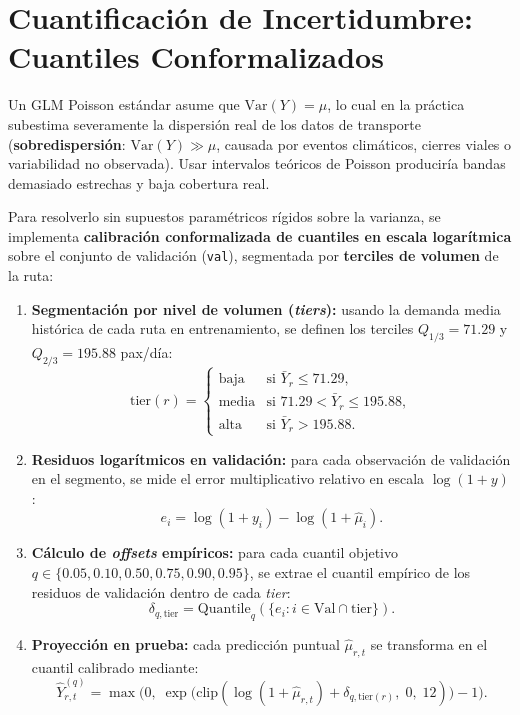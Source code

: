 \documentclass[11pt,a4paper]{article}
\begin{document}
\section{Cuantificación de Incertidumbre: Cuantiles Conformalizados}

Un GLM Poisson estándar asume que $\text{Var}(Y) = \mu$, lo cual en la práctica subestima severamente la dispersión real de los datos de transporte (\textbf{sobredispersión}: $\text{Var}(Y) \gg \mu$, causada por eventos climáticos, cierres viales o variabilidad no observada). Usar intervalos teóricos de Poisson produciría bandas demasiado estrechas y baja cobertura real.

Para resolverlo sin supuestos paramétricos rígidos sobre la varianza, se implementa \textbf{calibración conformalizada de cuantiles en escala logarítmica} sobre el conjunto de validación (\texttt{val}), segmentada por \textbf{terciles de volumen} de la ruta:

\begin{enumerate}[leftmargin=1.5em]
    \item \textbf{Segmentación por nivel de volumen (\textit{tiers}):} usando la demanda media histórica de cada ruta en entrenamiento, se definen los terciles $Q_{1/3} = 71.29$ y $Q_{2/3} = 195.88$ pax/día:
    \[
    \text{tier}(r) =
    \begin{cases}
    \text{baja}  & \text{si } \bar{Y}_r \le 71.29, \\
    \text{media} & \text{si } 71.29 < \bar{Y}_r \le 195.88, \\
    \text{alta}  & \text{si } \bar{Y}_r > 195.88.
    \end{cases}
    \]
    \item \textbf{Residuos logarítmicos en validación:} para cada observación de validación en el segmento, se mide el error multiplicativo relativo en escala $\log(1+y)$:
    \[
    e_i = \log(1 + y_i) - \log(1 + \hat{\mu}_i).
    \]
    \item \textbf{Cálculo de \textit{offsets} empíricos:} para cada cuantil objetivo $q \in \{0.05, 0.10, 0.50, 0.75, 0.90, 0.95\}$, se extrae el cuantil empírico de los residuos de validación dentro de cada \textit{tier}:
    \[
    \delta_{q, \text{tier}} = \text{Quantile}_q\!\left(\{ e_i : i \in \text{Val} \cap \text{tier} \}\right).
    \]
    \item \textbf{Proyección en prueba:} cada predicción puntual $\hat{\mu}_{r,t}$ se transforma en el cuantil calibrado mediante:
    \[
    \hat{Y}^{(q)}_{r,t} = \max\!\Big(0,\; \exp\!\big(\text{clip}(\log(1+\hat{\mu}_{r,t}) + \delta_{q,\text{tier}(r)},\; 0,\; 12)\big) - 1\Big).
    \]
\end{enumerate}
\end{document}
